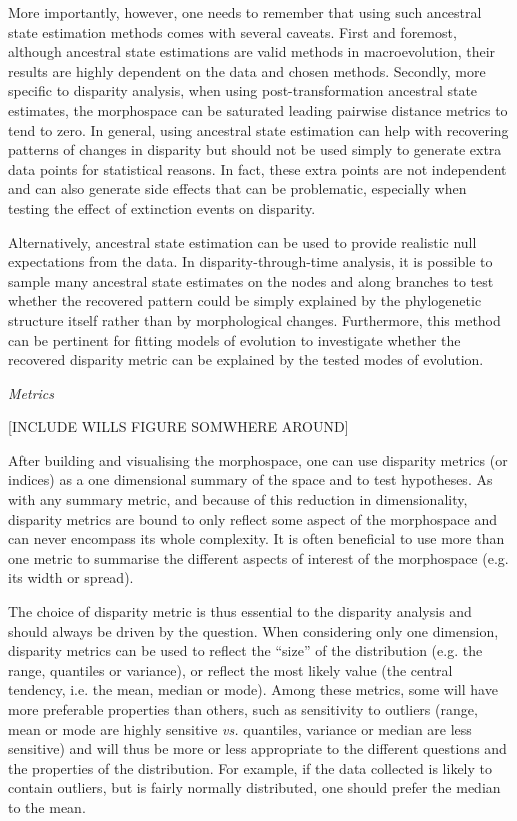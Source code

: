 \documentclass[12pt,letterpaper]{article}
\renewcommand{\subsection}[1]{%
\bigskip
\begin{center}
\begin{large}
\normalfont\itshape #1
\end{large}
\end{center}}
\begin{document}
More importantly, however, one needs to remember that using such ancestral state estimation methods comes with several caveats.
First and foremost, although ancestral state estimations are valid methods in macroevolution, their results are highly dependent on the data and chosen methods.
Secondly, more specific to disparity analysis, when using post-transformation ancestral state estimates, the morphospace can be saturated leading pairwise distance metrics to tend to zero.
In general, using ancestral state estimation can help with recovering patterns of changes in disparity but should not be used simply to generate extra data points for statistical reasons.
In fact, these extra points are not independent and can also generate side effects that can be problematic, especially when testing the effect of extinction events on disparity.

Alternatively, ancestral state estimation can be used to provide realistic null expectations from the data.
In disparity-through-time analysis, it is possible to sample many ancestral state estimates on the nodes and along branches to test whether the recovered pattern could be simply explained by the phylogenetic structure itself rather than by morphological changes.
Furthermore, this method can be pertinent for fitting models of evolution to investigate whether the recovered disparity metric can be explained by the tested modes of evolution.

\subsection{Metrics}
\label{metrics}
 
[INCLUDE WILLS FIGURE SOMWHERE AROUND]


After building and visualising the morphospace, one can use disparity metrics (or indices) as a one dimensional summary of the space and to test hypotheses.
As with any summary metric, and because of this reduction in dimensionality, disparity metrics are bound to only reflect some aspect of the morphospace and can never encompass its whole complexity.
It is often beneficial to use more than one metric to summarise the different aspects of interest of the morphospace (e.g. its width or spread).

The choice of disparity metric is thus essential to the disparity analysis and should always be driven by the question.
When considering only one dimension, disparity metrics can be used to reflect the ``size'' of the distribution (e.g. the range, quantiles or variance), or reflect the most likely value (the central tendency, i.e. the mean, median or mode).
Among these metrics, some will have more preferable properties than others, such as sensitivity to outliers (range, mean or mode are highly sensitive \textit{vs.} quantiles, variance or median are less sensitive) and will thus be more or less appropriate to the different questions and the properties of the distribution.
For example, if the data collected is likely to contain outliers, but is fairly normally distributed, one should prefer the median to the mean.
\end{document}
